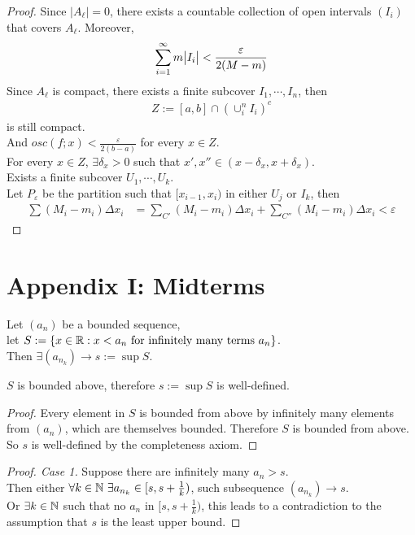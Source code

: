 \documentclass[11pt]{article}
\begin{document}
\begin{proof}
		Since $|A_\ell| = 0$, there exists a countable collection of open intervals $(I_i)$ that covers $A_\ell$. Moreover,
		\begin{align}
			\sum_{i=1}^\infty m \big \vert {I_i} \big \vert < \frac{\varepsilon}{2(M-m)}
		\end{align}
		Since $A_\ell$ is compact, there exists a finite subcover $I_1, \cdots, I_n$, then
		\begin{align}
			Z := [a, b] \cap (\cup_i^n I_i)^c
		\end{align}
		is still compact. \\
		And $osc(f; x) < \frac{\varepsilon}{2(b-a)}$ for every $x \in Z$. \\
		For every $x \in Z$, $\exists \delta_x > 0$ such that $x', x'' \in (x - \delta_x, x + \delta_x)$. \\
		Exists a finite subcover $U_1, \cdots, U_k$. \\
		Let $P_\varepsilon$ be the partition such that $[x_{i-1}, x_i)$ in either $U_j$ or $I_k$, then
		\begin{align}
			\sum (M_i - m_i) \Delta x_i &= \sum_{C'} (M_i - m_i) \Delta x_i + \sum_{C''} (M_i - m_i) \Delta x_i < \varepsilon
		\end{align}
	\end{proof}

 	\newpage
 	\section{Appendix I: Midterms}
 	\begin{proposition}[Midterm 1, Q7]
 		Let $(a_n)$ be a bounded sequence,\\
 		let $S:= \{x \in \mathbb{R}: x < a_n \text{{ for infinitely many terms }}a_n\}$. \\
 		Then $\exists (a_{n_k}) \to s := \sup S$.
 	\end{proposition}
 	
 	\begin{lemma}
 		$S$ is bounded above, therefore $s := \sup S$ is well-defined.
 	\end{lemma}
 	\begin{proof}
 		Every element in $S$ is bounded from above by infinitely many elements from $(a_n)$, which are themselves bounded. Therefore $S$ is bounded from above. \\
 		So $s$ is well-defined by the completeness axiom.
 	\end{proof}
 	
 	\begin{proof}[Proof. Case 1]
 		Suppose there are infinitely many $a_n > s$. \\
 		Then either $\forall k \in \mathbb{N}\ \exists a_{n_k} \in [s, s + \frac{1}{k})$, such subsequence $(a_{n_k}) \to s$. \\
 		Or $\exists k \in \mathbb{N}$ such that no $a_n$ in $[s, s + \frac{1}{k})$, this leads to a contradiction to the assumption that $s$ is the least upper bound.
 	\end{proof}
 	
\end{document}
